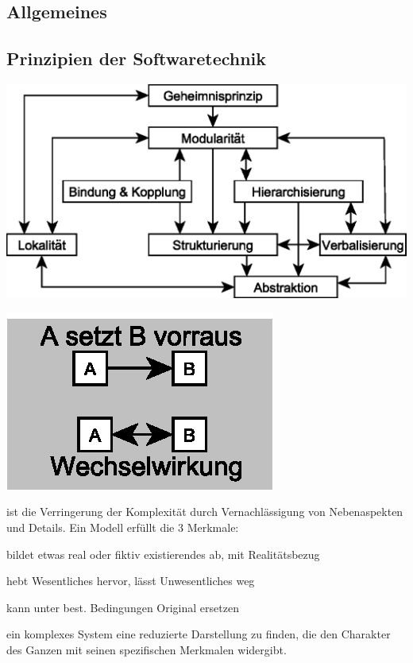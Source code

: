 \documentclass[a4paper,fontsize=9pt, DIV=calc]{scrartcl}
\begin{document}
\begin{multicols}{2}
\section{Allgemeines}
\subsection[Prinzipien der Softwaretechnik]{Prinzipien der Softwaretechnik}

\vspace{-0.5em}
\includegraphics[scale=0.72]{src/abhaengigkeiten}
\begin{flushright}
    \vspace{-6.5cm}
    \includegraphics[scale=0.70]{src/legende_abh}
    \vspace{4cm}
\end{flushright}


\begin{description}[leftmargin=*]\itemsep-2mm
    \item[Abstraktion] ist die Verringerung der Komplexität durch Vernachlässigung von Nebenaspekten und Details. Ein Modell erfüllt die 3 Merkmale: 
		\begin{description}[leftmargin=*]\itemsep-2mm
		\item[Abbildungsmerkmal] bildet etwas real oder fiktiv existierendes ab, mit Realitätsbezug
		\item[Verkürzungsmerkmal] hebt Wesentliches hervor, lässt Unwesentliches weg
		\item[Pragmatisches Merkmal] kann unter best. Bedingungen Original ersetzen
		\end{description}
    \item[Strukturierung] ein komplexes System eine reduzierte Darstellung zu finden, die den Charakter des Ganzen mit seinen spezifischen Merkmalen widergibt.


\end{description}
\end{multicols}
\end{document}
